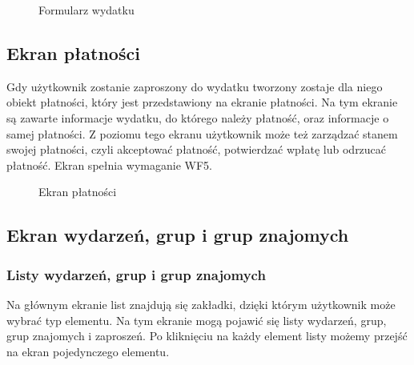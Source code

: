\begin{figure}[h!]%
    \centering
    \qquad
    \qquad
    \caption{Formularz wydatku}%
\end{figure}

\clearpage
\subsection{Ekran płatności}
Gdy użytkownik zostanie zaproszony do wydatku tworzony zostaje dla niego obiekt płatności, który jest przedstawiony na ekranie płatności. Na tym ekranie są zawarte informacje wydatku, do którego należy płatność, oraz informacje o samej płatności. Z poziomu tego ekranu użytkownik może też zarządzać stanem swojej płatności, czyli akceptować płatność, potwierdzać wpłatę lub odrzucać płatność. Ekran spełnia wymaganie WF5.

\begin{figure}[h!]%
    \centering
    \qquad
    \qquad
    \qquad
    \caption{Ekran płatności}%
\end{figure}

\clearpage
\subsection{Ekran wydarzeń, grup i grup znajomych}
\subsubsection{Listy wydarzeń, grup i grup znajomych}
Na głównym ekranie list znajdują się zakładki, dzięki którym użytkownik może wybrać typ elementu. Na tym ekranie mogą pojawić się listy wydarzeń, grup, grup znajomych i zaproszeń. Po kliknięciu na każdy element listy możemy przejść na ekran pojedynczego elementu.

